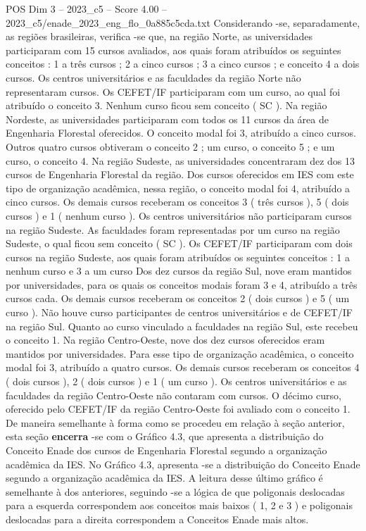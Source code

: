 \begin{textsample}{POS Dim 3 – 2023\_c5 – Score 4.00 – 2023\_c5/enade\_2023\_eng\_flo\_0a885c5cda.txt}
Considerando -se, separadamente, as regiões brasileiras, verifica -se que, na região Norte, as universidades participaram com 15 cursos avaliados, aos quais foram atribuídos os seguintes conceitos : 1 a três cursos ; 2 a cinco cursos ; 3 a cinco cursos ; e conceito 4 a dois cursos.
Os centros universitários e as faculdades da região Norte não representaram cursos.
Os CEFET/IF participaram com um curso, ao qual foi atribuído o conceito 3.
Nenhum curso ficou sem conceito ( SC ).
Na região Nordeste, as universidades participaram com todos os 11 cursos da área de Engenharia Florestal oferecidos.
O conceito modal foi 3, atribuído a cinco cursos.
Outros quatro cursos obtiveram o conceito 2 ; um curso, o conceito 5 ; e um curso, o conceito 4.
Na região Sudeste, as universidades concentraram dez dos 13 cursos de Engenharia Florestal da região.
Dos cursos oferecidos em IES com este tipo de organização acadêmica, nessa região, o conceito modal foi 4, atribuído a cinco cursos.
Os demais cursos receberam os conceitos 3 ( três cursos ), 5 ( dois cursos ) e 1 ( nenhum curso ).
Os centros universitários não participaram cursos na região Sudeste.
As faculdades foram representadas por um curso na região Sudeste, o qual ficou sem conceito ( SC ).
Os CEFET/IF participaram com dois cursos na região Sudeste, aos quais foram atribuídos os seguintes conceitos : 1 a nenhum curso e 3 a um curso Dos dez cursos da região Sul, nove eram mantidos por universidades, para os quais os conceitos modais foram 3 e 4, atribuído a três cursos cada.
Os demais cursos receberam os conceitos 2 ( dois cursos ) e 5 ( um curso ).
Não houve curso participantes de centros universitários e de CEFET/IF na região Sul.
Quanto ao curso vinculado a faculdades na região Sul, este recebeu o conceito 1.
Na região Centro-Oeste, nove dos dez cursos oferecidos eram mantidos por universidades.
Para esse tipo de organização acadêmica, o conceito modal foi 3, atribuído a quatro cursos.
Os demais cursos receberam os conceitos 4 ( dois cursos ), 2 ( dois cursos ) e 1 ( um curso ).
Os centros universitários e as faculdades da região Centro-Oeste não contaram com cursos.
O décimo curso, oferecido pelo CEFET/IF da região Centro-Oeste foi avaliado com o conceito 1.
De maneira semelhante à forma como se procedeu em relação à seção anterior, esta seção \textbf{encerra} -se com o Gráfico 4.3, que apresenta a distribuição do Conceito Enade dos cursos de Engenharia Florestal segundo a organização acadêmica da IES.
No Gráfico 4.3, apresenta -se a distribuição do Conceito Enade segundo a organização acadêmica da IES.
A leitura desse último gráfico é semelhante à dos anteriores, seguindo -se a lógica de que poligonais deslocadas para a esquerda correspondem aos conceitos mais baixos ( 1, 2 e 3 ) e poligonais deslocadas para a direita correspondem a Conceitos Enade mais altos.

\end{textsample}
